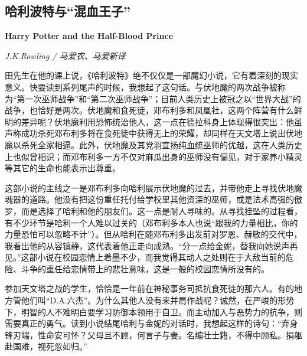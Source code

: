 \subsection*{哈利波特与“混血王子”}
\par \textbf{Harry Potter and the Half-Blood Prince}
\par \emph{J.K.Rowling / 马爱农、马爱新译} 
\par 田先生在他的课上说，《哈利波特》绝不仅仅是一部魔幻小说，它有着深刻的现实意义。快要读到系列尾声的时候，我想起了这句话。与伏地魔的两次战争被称为“第一次巫师战争”和“第二次巫师战争”；目前人类历史上被冠之以“世界大战”的战争，也恰好是两次。伏地魔和食死徒，邓布利多和凤凰社，这两个阵营有什么鲜明的差异呢？伏地魔利用恐怖统治他人，这一点在德拉科身上体现得很突出：他虽声称成功杀死邓布利多将在食死徒中获得无上的荣耀，却同样在天文塔上说出伏地魔以杀死全家相逼。此外，伏地魔及其党羽宣扬纯血统巫师的优越，这在人类历史上也似曾相识；而邓布利多一方不仅对麻瓜出身的巫师没有偏见，对于家养小精灵等其它的生命也能表示出尊重。
\par 这部小说的主线之一是邓布利多向哈利展示伏地魔的过去，并带他走上寻找伏地魔魂器的道路。他没有把这份重任托付给学校里其他资深的巫师，或是法术高强的傲罗，而是选择了哈利和他的朋友们。这一点是耐人寻味的。从寻找挂坠的过程看，有不少环节是哈利一个人难以过关的（邓布利多本人也说“跟我的力量相比，你的力量恐怕可以忽略不计”）。但从哈利在随邓布利多出发前对罗恩、赫敏的交代中，我看出他的从容镇静，这代表着他正走向成熟。“分一点给金妮，替我向她说声再见。”这部小说在校园恋情上着墨不少，而我觉得其动人之处则在于大敌当前的危险、斗争的重任给恋情带上的悲壮意味，这是一般的校园恋情所没有的。
\par 参加天文塔之战的学生，恰恰是一年前在神秘事务司抵抗食死徒的那六人。有的地方管他们叫“D.A.六杰”。为什么其他人没有来并肩作战呢？诚然，在严峻的形势下，明智的人不难明白要学习防御本领用于自卫。而主动加入与恶势力的抗争，则需要真正的勇气。读到小说结尾哈利与金妮的对话时，我想起这样的诗句：“弃身锋刃端，性命安可怀？父母且不顾，何言子与妻。名编壮士籍，不得中顾私。捐躯赴国难，视死忽如归。”
\par {}

